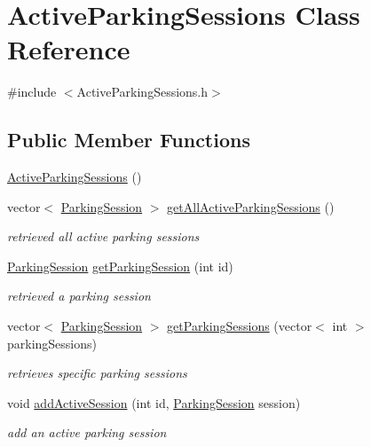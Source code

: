 \hypertarget{class_active_parking_sessions}{}\section{Active\+Parking\+Sessions Class Reference}
\label{class_active_parking_sessions}


{\ttfamily \#include $<$Active\+Parking\+Sessions.\+h$>$}

\subsection*{Public Member Functions}
\begin{DoxyCompactItemize}
\item 
\mbox{\hyperlink{class_active_parking_sessions_aa79b38fd8ad784f12c431bd095d2b627}{Active\+Parking\+Sessions}} ()
\item 
vector$<$ \mbox{\hyperlink{class_parking_session}{Parking\+Session}} $>$ \mbox{\hyperlink{class_active_parking_sessions_a70eefb3fa7f69bfb69daf95e2284c7dd}{get\+All\+Active\+Parking\+Sessions}} ()
\begin{DoxyCompactList}\small\item\em retrieved all active parking sessions \end{DoxyCompactList}\item 
\mbox{\hyperlink{class_parking_session}{Parking\+Session}} \mbox{\hyperlink{class_active_parking_sessions_a0aa9e3c0239a4f8ce36b96056f73beaa}{get\+Parking\+Session}} (int id)
\begin{DoxyCompactList}\small\item\em retrieved a parking session \end{DoxyCompactList}\item 
vector$<$ \mbox{\hyperlink{class_parking_session}{Parking\+Session}} $>$ \mbox{\hyperlink{class_active_parking_sessions_a6fd4dcdfd24dc941aff78a10f185a2ae}{get\+Parking\+Sessions}} (vector$<$ int $>$ parking\+Sessions)
\begin{DoxyCompactList}\small\item\em retrieves specific parking sessions \end{DoxyCompactList}\item 
void \mbox{\hyperlink{class_active_parking_sessions_ab214d63838f6a97742241b5c0a9be651}{add\+Active\+Session}} (int id, \mbox{\hyperlink{class_parking_session}{Parking\+Session}} session)
\begin{DoxyCompactList}\small\item\em add an active parking session \end{DoxyCompactList}\item 

\end{DoxyCompactItemize}
